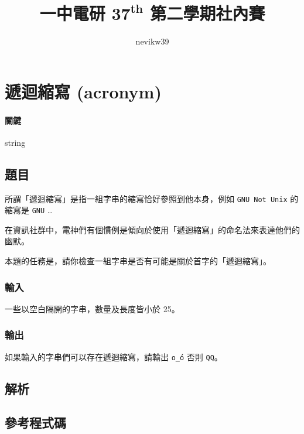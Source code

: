 \documentclass[a4paper,10pt]{article}
\title{\fontseries{b}一中電研 $\mathbf{37^{th}}$ 第二學期社內賽 \enspace {\huge\fontseries{eb}\selectfont 題目解析}}
\author{\fontshape{it}nevikw39}
\begin{document}
\maketitle

\begin{abstract}


\end{abstract}

\section{遞迴縮寫 (acronym)}

\paragraph{關鍵} string

\subsection{題目}

所謂「遞迴縮寫」是指一組字串的縮寫恰好參照到他本身，例如 \texttt{GNU Not Unix} 的縮寫是 \texttt{GNU} \dots

在資訊社群中，電神們有個慣例是傾向於使用「遞迴縮寫」的命名法來表達他們的幽默。

本題的任務是，請你檢查一組字串是否有可能是關於首字的「遞迴縮寫」。

\subsubsection{輸入}

一些以空白隔開的字串，數量及長度皆小於 25。

\subsubsection{輸出}

如果輸入的字串們可以存在遞迴縮寫，請輸出 \texttt{o\'\_\'o} 否則 \texttt{QQ}。

\subsection{解析}



\subsection{參考程式碼}
\end{document}
